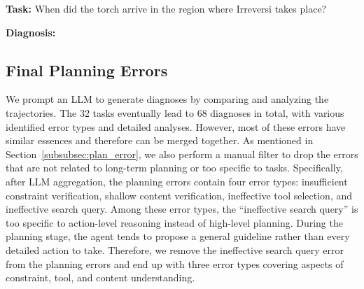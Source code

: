 \begin{tcolorbox}[
    colback=gray!5,
    colframe=gray!50!black,
    title=\textbf{Example Diagnosis from MuSiQue},
    fonttitle=\bfseries,
    breakable
]

\textbf{Task:} When did the torch arrive in the region where Irreversi takes place?

\tcbline

\textbf{Diagnosis:}
\vspace{-8pt}

\begin{description}[
    leftmargin=0.0em,      
    font=\bfseries\itshape, 
    itemsep=-0.5em    
]

    
    
    

\end{description}

\end{tcolorbox}

\subsection{Final Planning Errors} 

We prompt an LLM to generate diagnoses by comparing and analyzing the trajectories. The 32 tasks eventually lead to 68 diagnoses in total, with various identified error types and detailed analyses. However, most of these errors have similar essences and therefore can be merged together. As mentioned in Section~\ref{subsubsec:plan_error}, we also perform a manual filter to drop the errors that are not related to long-term planning or too specific to tasks. Specifically, after LLM aggregation, the planning errors contain four error types: insufficient constraint verification, shallow content verification, ineffective tool selection, and ineffective search query. Among these error types, the ``ineffective search query'' is too specific to action-level reasoning instead of high-level planning. During the planning stage, the agent tends to propose a general guideline rather than every detailed action to take. Therefore, we remove the ineffective search query error from the planning errors and end up with three error types covering aspects of constraint, tool, and content understanding.

